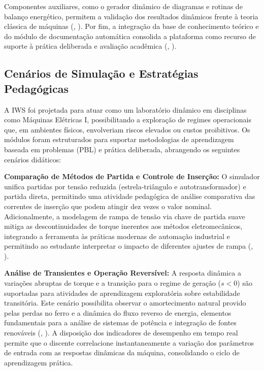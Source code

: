 \documentclass[a4paper]{ifacconf}
\begin{document}
Componentes auxiliares, como o gerador dinâmico de diagramas e rotinas de balanço energético, permitem a validação dos resultados dinâmicos frente à teoria clássica de máquinas (\citeauthor{kumari2025comparative}, \citeyear{kumari2025comparative}). Por fim, a integração da base de conhecimento teórico e do módulo de documentação automática consolida a plataforma como recurso de suporte à prática deliberada e avaliação acadêmica (\citeauthor{souza2011ambiente}, \citeyear{souza2011ambiente}).

\subsection{Cenários de Simulação e Estratégias Pedagógicas}

A IWS foi projetada para atuar como um laboratório dinâmico em disciplinas como Máquinas Elétricas I, possibilitando a exploração de regimes operacionais que, em ambientes físicos, envolveriam riscos elevados ou custos proibitivos. Os módulos foram estruturados para suportar metodologias de aprendizagem baseada em problemas (PBL) e prática deliberada, abrangendo os seguintes cenários didáticos:

\textbf{Comparação de Métodos de Partida e Controle de Inserção:} O simulador unifica partidas por tensão reduzida (estrela-triângulo e autotransformador) e partida direta, permitindo uma atividade pedagógica de análise comparativa das correntes de inserção que podem atingir dez vezes o valor nominal. Adicionalmente, a modelagem de rampa de tensão via chave de partida suave mitiga as descontinuidades de torque inerentes aos métodos eletromecânicos, integrando a ferramenta às práticas modernas de automação industrial e permitindo ao estudante interpretar o impacto de diferentes ajustes de rampa (\citeauthor{singh2015}, \citeyear{singh2015}).

\textbf{Análise de Transientes e Operação Reversível:} A resposta dinâmica a variações abruptas de torque e a transição para o regime de geração ($s < 0$) são suportadas para atividades de aprendizagem exploratória sobre estabilidade transitória. Este cenário possibilita observar o amortecimento natural provido pelas perdas no ferro e a dinâmica do fluxo reverso de energia, elementos fundamentais para a análise de sistemas de potência e integração de fontes renováveis (\citeauthor{ikeda2007simulation}, \citeyear{ikeda2007simulation}). A disposição dos indicadores de desempenho em tempo real permite que o discente correlacione instantaneamente a variação dos parâmetros de entrada com as respostas dinâmicas da máquina, consolidando o ciclo de aprendizagem prática.
\end{document}
